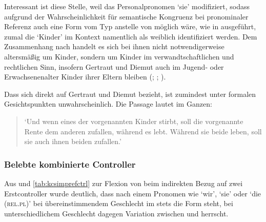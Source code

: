 Interessant ist diese Stelle, weil  das Personalpronomen 
`sie' modifiziert, sodass aufgrund der Wahrscheinlichkeit für semantische
Kongruenz bei pronominaler Referenz auch eine Form vom Typ 
anstelle von  möglich wäre, wie in 
ausgeführt, zumal die  `Kinder' im Kontext namentlich als weiblich
identifiziert werden. Dem Zusammenhang nach handelt es sich bei ihnen nicht
notwendigerweise altersmäßig um Kinder, sondern um Kinder im
verwandt\-schaft\-lichen und rechtlichen Sinn, insofern Gertraut und Diemut
auch im Jugend- oder Erwachsenen\-alter Kinder ihrer Eltern bleiben
(\cites(Nr.~2960)[240,31+35]{cao4};
\cites(Nr.~2719)[vgl.~auch][96,40--97,18]{cao4}; \cite[569, 619]{caor}).

Dass sich  direkt auf Gertraut und Diemut bezieht, ist
zumindest unter formalen Gesichtspunkten unwahrscheinlich. Die Passage lautet
im Ganzen:

\begin{quote}
	 \autocites(Nr.~2960)[240,37--39]{cao4}

`Und wenn eines der vorgenannten Kinder
stirbt, soll die vorgenannte Rente dem anderen zufallen, während es lebt.
Während sie beide leben, soll sie auch ihnen beiden zufallen.'
\end{quote}

\subsubsection{Belebte kombinierte Controller}

Aus  und \ref{tab:kcsimprefctrl} zur Flexion von
 beim indirekten Bezug auf zwei Erstcontroller wurde deutlich, dass
nach einem Pronomen wie  `wir',  `sie' oder  `die
(\textsc{rel.pl})' bei übereinstimmendem Geschlecht im \CAO{} stets die Form
 steht, bei unterschiedlichem Geschlecht dagegen Variation zwischen
  und 
 herrscht.

